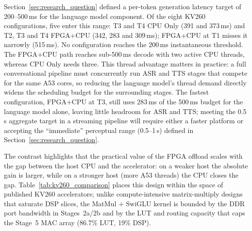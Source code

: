 Section~\ref{sec:research_question} defined a per-token generation latency target of
200--500\,ms for the language model component. Of the eight KV260 configurations, five
enter this range: T3 and T4 CPU Only (391 and 373\,ms) and T2, T3 and T4 FPGA+CPU (342,
283 and 309\,ms); FPGA+CPU at T1 misses it narrowly (515\,ms). No configuration reaches the 200\,ms instantaneous threshold. The
FPGA+CPU path reaches sub-500\,ms decode with two active CPU threads, whereas CPU Only
needs three. This thread advantage matters in practice: a full conversational pipeline
must concurrently run ASR and TTS stages that compete for the same A53 cores, so
reducing the language model's thread demand directly widens the scheduling budget for
the surrounding stages. The fastest configuration, FPGA+CPU at T3, still uses 283\,ms
of the 500\,ms budget for the language model alone, leaving little headroom for ASR and
TTS; meeting the 0.5\,s aggregate target in a streaming pipeline will require either a
faster platform or accepting the ``immediate'' perceptual range (0.5--1\,s) defined in
Section~\ref{sec:research_question}.

The contrast highlights that the practical value of the FPGA offload scales with the gap
between the host CPU and the accelerator: on a weaker host the absolute gain is larger,
while on a stronger host (more A53 threads) the CPU closes the gap.
Table~\ref{tab:kv260_comparison} places this design within the space of published KV260
accelerators; unlike compute-intensive matrix-multiply designs that saturate DSP slices,
the MatMul + SwiGLU kernel is bounded by the DDR port bandwidth in Stages~2a/2b and by
the LUT and routing capacity that caps the Stage~5 MAC array (86.7\% LUT, 19\% DSP).

